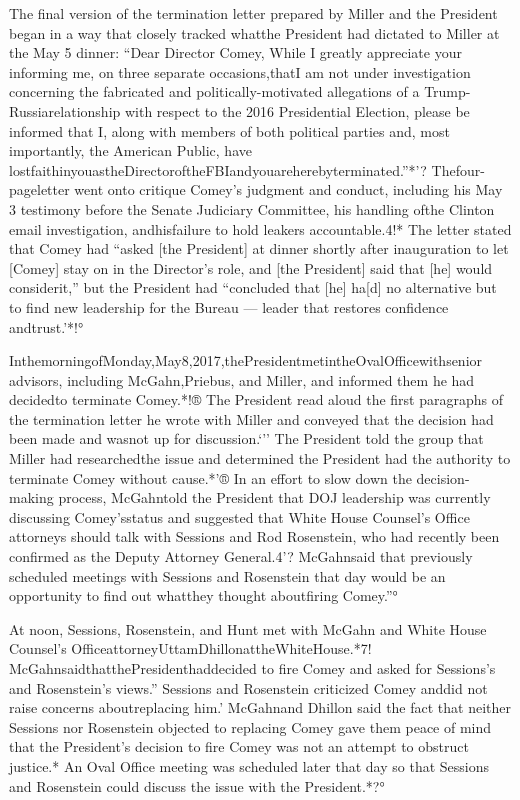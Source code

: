 {The final version of the termination letter prepared by Miller and the President began in a way that closely tracked whatthe President had dictated to Miller at the May 5 dinner: “Dear Director Comey, While I greatly appreciate your informing me, on three separate occasions,thatI am not under investigation concerning the fabricated and politically-motivated allegations of a Trump-Russiarelationship with respect to the 2016 Presidential Election, please be informed that I, along with members of both political parties and, most importantly, the American Public, have lostfaithinyouastheDirectoroftheFBIandyouareherebyterminated.”*'? Thefour-pageletter went onto critique Comey’s judgment and conduct, including his May 3 testimony before the
Senate Judiciary Committee, his handling ofthe Clinton email investigation, andhisfailure to hold leakers accountable.4!* The letter stated that Comey had “asked [the President] at dinner shortly after inauguration to let [Comey] stay on in the Director’s role, and [the President] said that [he]
would considerit,” but the President had “concluded that [he] ha[d] no alternative but to find new leadership for the Bureau — leader that restores confidence andtrust.’*!°

InthemorningofMonday,May8,2017,thePresidentmetintheOvalOfficewithsenior advisors, including McGahn,Priebus, and Miller, and informed them he had decidedto terminate Comey.*!® The President read aloud the first paragraphs of the termination letter he wrote with Miller and conveyed that the decision had been made and wasnot up for discussion.‘'’ The President told the group that Miller had researchedthe issue and determined the President had the authority to terminate Comey without cause.*'® In an effort to slow down the decision-making process, McGahntold the President that DOJ leadership was currently discussing Comey’sstatus and suggested that White House Counsel’s Office attorneys should talk with Sessions and Rod Rosenstein, who had recently been confirmed as the Deputy Attorney General.4'? McGahnsaid that previously scheduled meetings with Sessions and Rosenstein that day would be an opportunity to find out whatthey thought aboutfiring Comey.”°

At noon, Sessions, Rosenstein, and Hunt met with McGahn and White House Counsel’s OfficeattorneyUttamDhillonattheWhiteHouse.*7! McGahnsaidthatthePresidenthaddecided to fire Comey and asked for Sessions’s and Rosenstein’s views.” Sessions and Rosenstein criticized Comey anddid not raise concerns aboutreplacing him.’ McGahnand Dhillon said the fact that neither Sessions nor Rosenstein objected to replacing Comey gave them peace of mind that the President’s decision to fire Comey was not an attempt to obstruct justice.* An Oval Office meeting was scheduled later that day so that Sessions and Rosenstein could discuss the issue with the President.*?°

}
